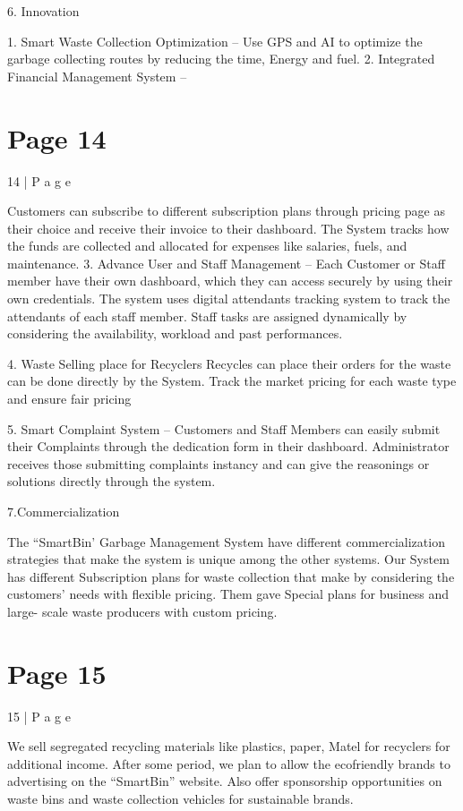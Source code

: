 \documentclass{article}
\begin{document}
 
 
 
6. Innovation 
 
1. Smart Waste Collection Optimization –  
      Use GPS and AI to optimize the garbage collecting routes by reducing the time, 
Energy and fuel. 
2. Integrated Financial Management System –  


\section*{Page 14}
14 | P a g e 
 
     Customers can subscribe to different subscription plans through pricing page as 
their choice and receive their invoice to their dashboard.   The System tracks how the 
funds are collected and allocated for expenses like salaries, fuels, and maintenance. 
3. Advance User and Staff Management –  
       Each Customer or Staff member have their own dashboard, which they can 
access securely by using their own credentials.  The system uses digital attendants 
tracking system to track the attendants of each staff member. Staff tasks are assigned 
dynamically by considering the availability, workload and past performances. 
  
4. Waste Selling place for Recyclers 
                     Recycles can place their orders for the waste can be done directly by the System.     
Track the market pricing for each waste type and ensure fair pricing 
 
5. Smart Complaint System – 
         Customers and Staff Members can easily submit their Complaints through the 
dedication form in their dashboard.  Administrator receives those submitting 
complaints instancy and can give the reasonings or solutions directly through the 
system. 
 
 
 
 
 7.Commercialization 
  
     The “SmartBin’ Garbage Management System have different commercialization 
strategies that make the system is unique among the other systems. 
 Our System has different Subscription plans for waste collection that make by considering 
the customers’ needs with flexible pricing. Them gave Special plans for business and large-
scale waste producers with custom pricing.  

\section*{Page 15}
15 | P a g e 
 
We sell segregated recycling materials like plastics, paper, Matel for recyclers for additional 
income.  After some period, we plan to allow the ecofriendly brands to advertising on the 
“SmartBin” website. Also offer sponsorship opportunities on waste bins and waste 
collection vehicles for sustainable brands. 
 
\end{document}
